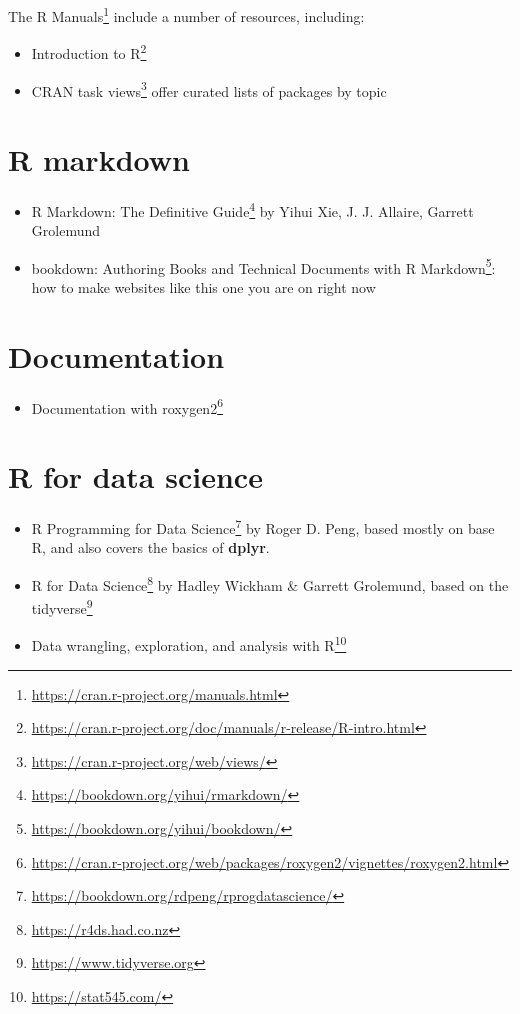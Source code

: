\documentclass[
]{book}
\DeclareRobustCommand{\href}[2]{#2\footnote{\url{#1}}}
\providecommand{\tightlist}{%
  \setlength{\itemsep}{0pt}\setlength{\parskip}{0pt}}
\renewcommand{\href}[2]{#2\footnote{\url{#1}}}
\begin{document}
\href{https://cran.r-project.org/manuals.html}{The R Manuals} include a number of resources, including:

\begin{itemize}
\tightlist
\item
  \href{https://cran.r-project.org/doc/manuals/r-release/R-intro.html}{Introduction to R}
\item
  \href{https://cran.r-project.org/web/views/}{CRAN task views} offer curated lists of packages by topic
\end{itemize}

\hypertarget{r-markdown}{%
\section{R markdown}\label{r-markdown}}

\begin{itemize}
\tightlist
\item
  \href{https://bookdown.org/yihui/rmarkdown/}{R Markdown: The Definitive Guide} by Yihui Xie, J. J. Allaire, Garrett Grolemund
\item
  \href{https://bookdown.org/yihui/bookdown/}{bookdown: Authoring Books and Technical Documents with R Markdown}: how to make websites like this one you are on right now
\end{itemize}

\hypertarget{documentation}{%
\section{Documentation}\label{documentation}}

\begin{itemize}
\tightlist
\item
  \href{https://cran.r-project.org/web/packages/roxygen2/vignettes/roxygen2.html}{Documentation with roxygen2}
\end{itemize}

\hypertarget{r-for-data-science}{%
\section{R for data science}\label{r-for-data-science}}

\begin{itemize}
\tightlist
\item
  \href{https://bookdown.org/rdpeng/rprogdatascience/}{R Programming for Data Science} by Roger D. Peng, based mostly on base R, and also covers the basics of \textbf{dplyr}.
\item
  \href{https://r4ds.had.co.nz}{R for Data Science} by Hadley Wickham \& Garrett Grolemund, based on the \href{https://www.tidyverse.org}{tidyverse}
\item
  \href{https://stat545.com/}{Data wrangling, exploration, and analysis with R}
\end{itemize}
\end{document}
